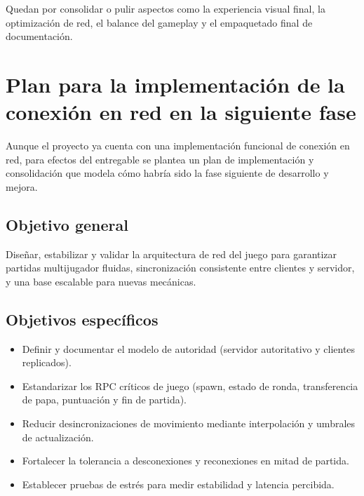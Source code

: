 \documentclass[11pt,a4paper]{article}
\begin{document}
Quedan por consolidar o pulir aspectos como la experiencia visual final, la optimización de red, el balance del gameplay y el empaquetado final de documentación.

\section{Plan para la implementación de la conexión en red en la siguiente fase}
Aunque el proyecto ya cuenta con una implementación funcional de conexión en red, para efectos del entregable se plantea un plan de implementación y consolidación que modela cómo habría sido la fase siguiente de desarrollo y mejora.

\subsection{Objetivo general}
Diseñar, estabilizar y validar la arquitectura de red del juego para garantizar partidas multijugador fluidas, sincronización consistente entre clientes y servidor, y una base escalable para nuevas mecánicas.

\subsection{Objetivos específicos}
\begin{itemize}[nosep]
    \item Definir y documentar el modelo de autoridad (servidor autoritativo y clientes replicados).
    \item Estandarizar los RPC críticos de juego (spawn, estado de ronda, transferencia de papa, puntuación y fin de partida).
    \item Reducir desincronizaciones de movimiento mediante interpolación y umbrales de actualización.
    \item Fortalecer la tolerancia a desconexiones y reconexiones en mitad de partida.
    \item Establecer pruebas de estrés para medir estabilidad y latencia percibida.
\end{itemize}
\end{document}
